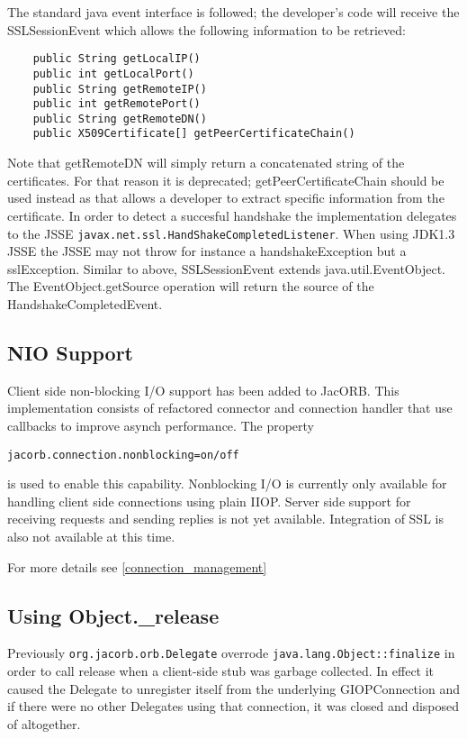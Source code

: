 The standard java event interface is followed; the developer's code will receive the
SSLSessionEvent which allows the following information to be retrieved:
\begin{small}
\begin{verbatim}
    public String getLocalIP()
    public int getLocalPort()
    public String getRemoteIP()
    public int getRemotePort()
    public String getRemoteDN()
    public X509Certificate[] getPeerCertificateChain()
\end{verbatim}
\end{small}

Note that getRemoteDN will simply return a concatenated string of the
certificates. For that reason it is deprecated; getPeerCertificateChain should
be used instead as that allows a developer to extract specific information from
the certificate.  In order to detect a succesful handshake the implementation
delegates to the JSSE {\tt javax.net.ssl.HandShakeCompletedListener}. When using
JDK1.3 JSSE the JSSE may not throw for instance a handshakeException but a
sslException. Similar to above, SSLSessionEvent extends java.util.EventObject. The
EventObject.getSource operation will return the source of the HandshakeCompletedEvent.

\subsection{NIO Support}
Client side non-blocking I/O support has been added to JacORB. This
implementation consists of refactored connector and connection handler that
use callbacks to improve asynch performance. The property
\begin{verbatim}
jacorb.connection.nonblocking=on/off
\end{verbatim}
is used to enable this capability. Non\-blocking I/O is currently only
available for handling client side connections using plain IIOP.
Server side support for receiving requests and sending replies is not yet
available. Integration of SSL is also not available at this time.

For more details see \ref{connection_management}

\subsection{Using Object.\_release}

Previously {\tt org.jacorb.orb.Delegate} overrode
{\tt java.lang.Object::finalize} in order to call release when a client-side
stub was garbage collected. In effect it caused the Delegate to unregister
 itself from the underlying GIOPConnection and if there were no other
Delegates using that connection, it was closed and disposed of altogether.


